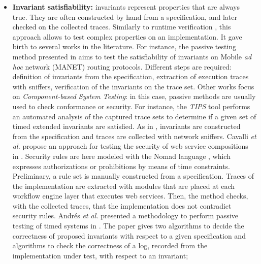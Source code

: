 \begin{itemize}

    \item \textbf{Invariant satisfiability:} invariants represent
        properties that are always true. They are often
        constructed by hand from a specification, and later
        checked on the collected traces. Similarly to runtime
        verification \cite{Leucker2009293}, this approach allows
        to test complex properties on an implementation. It gave
        birth to several works in the literature. For instance,
        the passive testing method presented in \cite{CMdO09}
        aims to test the satisfiability of invariants on Mobile
        \emph{ad hoc}
        network (MANET) routing protocols.  Different steps are
        required: definition of invariants from the
        specification, extraction of execution traces with
        sniffers, verification of the invariants on the trace
        set. Other works focus on \emph{Component-based System
        Testing}: in this case, passive methods are usually used
        to check conformance or security. For instance, the
        \textit{TIPS} tool \cite{5552735} performs an automated
        analysis of the captured trace sets to determine if a
        given set of timed extended invariants are satisfied. As
        in \cite{CMdO09}, invariants are constructed from the
        specification and traces are collected with network
        sniffers. Cavalli \emph{et al.} propose an approach for
        testing the security of web service compositions in
        \cite{cavalli2009passive}. Security rules are here
        modeled with the Nomad language \cite{cuppens2005nomad},
        which expresses authorizations or prohibitions by means
        of time constraints. Preliminary, a rule set is manually
        constructed from a specification. Traces of the
        implementation are extracted with modules that are placed
        at each workflow engine layer that executes web services.
        Then, the method checks, with the collected traces, that
        the implementation does not contradict security rules.
        Andrés \emph{et al.} presented a methodology to perform
        passive testing of timed systems in
        \cite{andres2012formal}. The paper gives two algorithms
        to decide the correctness of proposed invariants with
        respect to a given specification and algorithms to check
        the correctness of a log, recorded from the
        implementation under test, with respect to an invariant;


\end{itemize}
